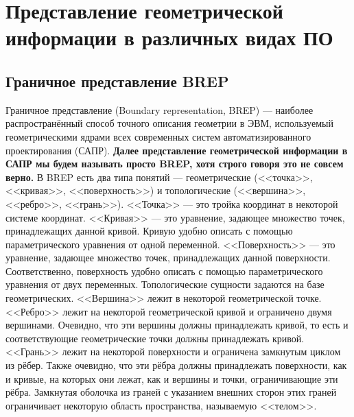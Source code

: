 \section{Представление геометрической информации в различных видах ПО}\label{sec:geoDifferentReprs}


\subsection{Граничное представление BREP}\label{sec:geoCAD}

Граничное представление (Boundary representation, BREP) --- наиболее распространённый способ точного описания геометрии в ЭВМ, используемый геометрическими ядрами всех современных систем автоматизированного проектирования (САПР).
\textbf{Далее представление геометрической информации в САПР мы будем называть просто BREP, хотя строго говоря это не совсем верно.}
В BREP есть два типа понятий --- геометрические (<<точка>>, <<кривая>>, <<поверхность>>) и топологические (<<вершина>>, <<ребро>>, <<грань>>). <<Точка>> --- это тройка координат в некоторой системе координат. <<Кривая>> --- это уравнение, задающее множество точек, принадлежащих данной кривой. Кривую удобно описать с помощью параметрического уравнения от одной переменной. <<Поверхность>> --- это уравнение, задающее множество точек, принадлежащих данной поверхности. Соответственно, поверхность удобно описать с помощью параметрического уравнения от двух переменных. Топологические сущности задаются на базе геометрических. <<Вершина>> лежит в некоторой геометрической точке. <<Ребро>> лежит на некоторой геометрической кривой и ограничено двумя вершинами. Очевидно, что эти вершины должны принадлежать кривой, то есть и соответствующие геометрические точки должны принадлежать кривой. <<Грань>> лежит на некоторой поверхности и ограничена замкнутым циклом из рёбер. Также очевидно, что эти рёбра должны принадлежать поверхности, как и кривые, на которых они лежат, как и вершины и точки, ограничивающие эти рёбра. Замкнутая оболочка из граней с указанием внешних сторон этих граней ограничивает некоторую область пространства, называемую <<телом>>.

